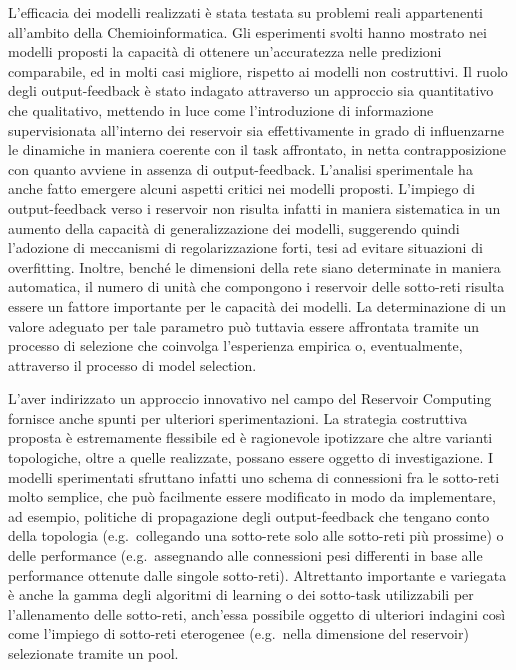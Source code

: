 L'efficacia dei modelli realizzati è stata testata su problemi reali appartenenti all'ambito della Chemioinformatica. 
Gli esperimenti svolti hanno mostrato nei modelli proposti la capacità di ottenere un'accuratezza nelle predizioni comparabile, ed in molti casi migliore, rispetto ai modelli non costruttivi.
Il ruolo degli output-feedback è stato indagato attraverso un approccio sia quantitativo che qualitativo, mettendo in luce come l'introduzione di informazione supervisionata all'interno dei reservoir sia effettivamente in grado di influenzarne le dinamiche in maniera coerente con il task affrontato, in netta contrapposizione con quanto avviene in assenza di output-feedback. 
L'analisi sperimentale ha anche fatto emergere alcuni aspetti critici nei modelli proposti. L'impiego di output-feedback verso i reservoir non risulta infatti in maniera sistematica in un aumento della capacità di generalizzazione dei modelli, suggerendo quindi l'adozione di meccanismi di regolarizzazione forti, tesi ad evitare situazioni di overfitting. Inoltre, benché le dimensioni della rete siano determinate in maniera automatica, il numero di unità che compongono i reservoir delle sotto-reti risulta essere un fattore importante per le capacità dei modelli. La determinazione di un valore adeguato per tale parametro può tuttavia essere affrontata tramite un processo di selezione che coinvolga l'esperienza empirica o, eventualmente, attraverso il processo di model selection.

L'aver indirizzato un approccio innovativo nel campo del Reservoir Computing fornisce anche spunti per ulteriori sperimentazioni. 
La strategia costruttiva proposta è estremamente flessibile ed è ragionevole ipotizzare che altre varianti topologiche, oltre a quelle realizzate, possano essere oggetto di investigazione. I modelli sperimentati sfruttano infatti uno schema di connessioni fra le sotto-reti molto semplice, che può facilmente essere modificato in modo da implementare, ad esempio, politiche di propagazione degli output-feedback che tengano conto della topologia (e.g.\ collegando una sotto-rete solo alle sotto-reti più prossime) o delle performance (e.g.\ assegnando alle connessioni pesi differenti in base alle performance ottenute dalle singole sotto-reti).
Altrettanto importante e variegata è anche la gamma degli algoritmi di learning o dei sotto-task utilizzabili per l'allenamento delle sotto-reti, anch'essa possibile oggetto di ulteriori indagini così come l'impiego di sotto-reti eterogenee (e.g.\ nella dimensione del reservoir) selezionate tramite un pool.

